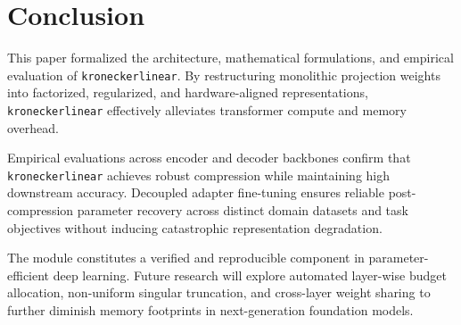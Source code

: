 \section{Conclusion}
This paper formalized the architecture, mathematical formulations, and empirical evaluation of \texttt{kroneckerlinear}. By restructuring monolithic projection weights into factorized, regularized, and hardware-aligned representations, \texttt{kroneckerlinear} effectively alleviates transformer compute and memory overhead.

Empirical evaluations across encoder and decoder backbones confirm that \texttt{kroneckerlinear} achieves robust compression while maintaining high downstream accuracy. Decoupled adapter fine-tuning ensures reliable post-compression parameter recovery across distinct domain datasets and task objectives without inducing catastrophic representation degradation.

The module constitutes a verified and reproducible component in parameter-efficient deep learning. Future research will explore automated layer-wise budget allocation, non-uniform singular truncation, and cross-layer weight sharing to further diminish memory footprints in next-generation foundation models.
